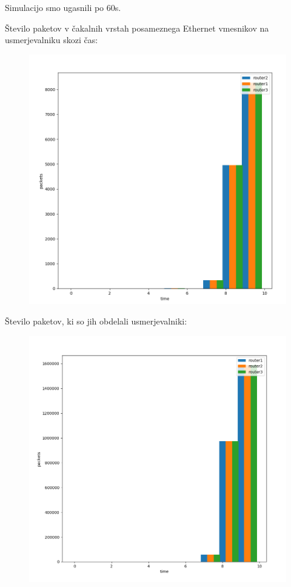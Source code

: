 \documentclass[11pt,a4paper,slovene]{myarticle}
\begin{document}
Simulacijo smo ugasnili po 60s.

Število paketov v čakalnih vrstah posameznega Ethernet vmesnikov na usmerjevalniku skozi čas:
\begin{figure}[h]
  \includegraphics[width=\linewidth]{queuelength-2.png}
\end{figure}

\pagebreak

Število paketov, ki so jih obdelali usmerjevalniki:
\begin{figure}[h]
  \includegraphics[width=\linewidth]{packets-2.png}
\end{figure}
\end{document}
